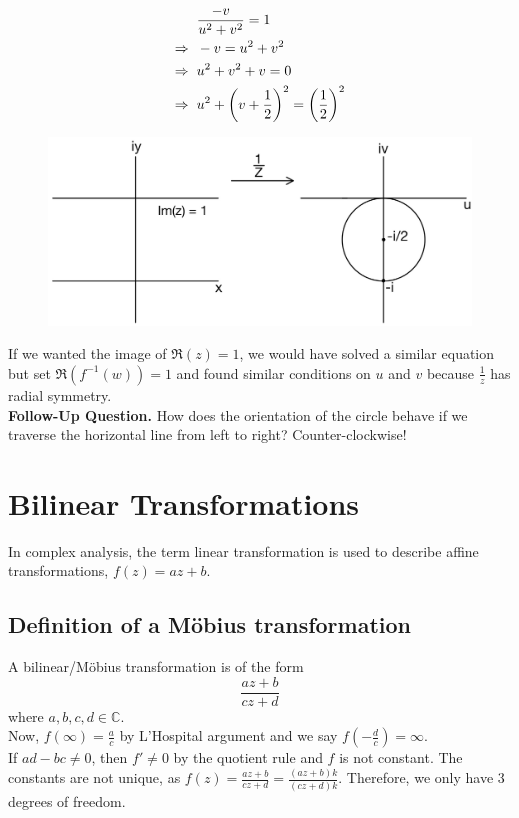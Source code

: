 \documentclass[11pt]{article}
\begin{document}
\begin{align*}
&\frac{-v}{u^2 + v^2} = 1 \\
\Rightarrow \hspace{2mm}&-v = u^2 + v^2 \\
\Rightarrow \hspace{2mm}&u^2 + v^2 + v = 0 \\
\Rightarrow \hspace{2mm}&u^2 + \left(v + \frac{1}{2}\right)^2 = \left(\frac{1}{2}\right)^2 
\end{align*}
\begin{figure}[H]
\includegraphics[scale = 0.2]{9_9}
\centering
\end{figure}
If we wanted the image of $\Re(z) = 1$, we would have solved a similar equation but set $\Re(f^{-1}(w)) = 1$ and found similar conditions on $u$ and $v$ because $\frac{1}{z}$ has radial symmetry. \\
\newline
\textbf{Follow-Up Question.} How does the orientation of the circle behave if we traverse the horizontal line from left to right? Counter-clockwise! \\

\newpage
\section{Bilinear Transformations}
In complex analysis, the term linear transformation is used to describe affine transformations, $f(z) = az + b$. \\
\subsection{Definition of a Möbius transformation}
A bilinear/Möbius transformation is of the form 
$$\frac{az + b}{cz + d}$$
where $a, b, c, d \in \mathbb{C}$. \\
Now, $f(\infty) = \frac{a}{c}$ by L'Hospital argument and we say $f(-\frac{d}{c}) = \infty$. \\
If $ad - bc \neq 0$, then $f' \neq 0$ by the quotient rule and $f$ is not constant. The constants are not unique, as $f(z) = \frac{az + b}{cz + d} = \frac{(az+b)k}{(cz + d)k}$. Therefore, we only have 3 degrees of freedom. \\
\end{document}
